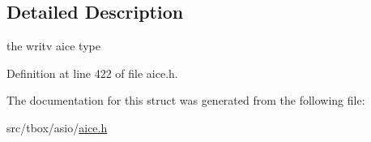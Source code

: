 \subsection{Detailed Description}
the writv aice type 

Definition at line 422 of file aice.\-h.



The documentation for this struct was generated from the following file\-:\begin{DoxyCompactItemize}
\item 
src/tbox/asio/\hyperlink{aice_8h}{aice.\-h}\end{DoxyCompactItemize}
